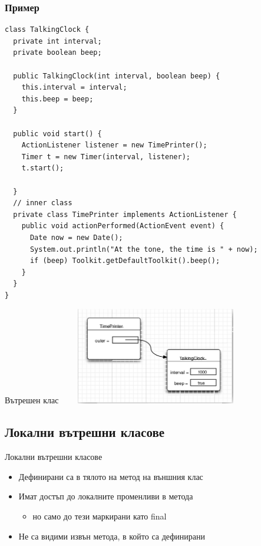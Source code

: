 \documentclass{beamer}
\begin{document}
\begin{frame}[fragile]
  \frametitle{Пример}
  \transdissolve
\begin{lstlisting}[basicstyle=\tiny]
class TalkingClock {
  private int interval;
  private boolean beep;

  public TalkingClock(int interval, boolean beep) {
    this.interval = interval;
    this.beep = beep;
  }
  
  public void start() {
    ActionListener listener = new TimePrinter();
    Timer t = new Timer(interval, listener);
    t.start();
  
  }
  // inner class
  private class TimePrinter implements ActionListener {
    public void actionPerformed(ActionEvent event) {
      Date now = new Date();
      System.out.println("At the tone, the time is " + now);
      if (beep) Toolkit.getDefaultToolkit().beep();
    }
  }
}
\end{lstlisting}
\end{frame}


\begin{frame}{Вътрешен клас}
  \transdissolve
  \includegraphics[width=320px,height=160px]{images/inner-class.png}
\end{frame}


\subsection{Локални вътрешни класове}
\begin{frame}{Локални вътрешни класове}
  \transdissolve
  \begin{itemize}
  \item Дефинирани са в тялото на метод на външния клас \pause
  \item Имат достъп до локалните променливи в метода \pause
    \begin{itemize}
      \item но само до тези маркирани като final \pause
    \end{itemize}
  \item Не са видими извън метода, в който са дефинирани
  \end{itemize}
\end{frame}
\end{document}
